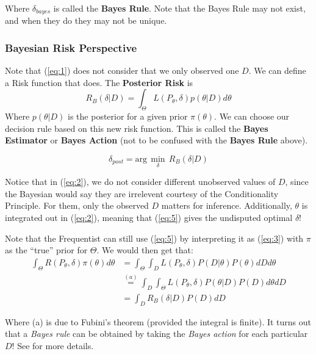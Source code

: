 \documentclass[]{article}
\theoremstyle{mattstyle}
\theoremstyle{definition}
\begin{document}
Where $\delta_{bayes}$ is called the \textbf{Bayes Rule}. Note that the Bayes Rule may not exist, and when they do they may not be unique.

\subsubsection{Bayesian Risk Perspective} 

Note that (\ref{eq:1}) does not consider that we only observed one \(D\). We can define a Risk function that does. The \textbf{Posterior Risk} is
\begin{equation}\label{eq:2}R_B(\delta|D) = \int_{\Theta}^{}L(P_{\theta},\delta)p(\theta|D)d\theta
\end{equation}
Where $p(\theta|D)$ is the posterior for a given prior $\pi(\theta)$. We can choose our decision rule based on this new risk function. This is called the \textbf{Bayes Estimator} or \textbf{Bayes Action} (not to be confused with the \textbf{Bayes Rule} above).

\begin{equation}\label{eq:5}
\delta_{post}= \text{arg}\,\min\limits_{\delta}\,R_B(\delta|D)
\end{equation}


Notice that in (\ref{eq:2}), we do not consider different unobserved values of \(D\), since the Bayesian would say they are irrelevent courtesy of the Conditionality Principle. For them, only the observed $D$ matters for inference. 
Additionally, \(\theta\) is integrated out in (\ref{eq:2}), meaning that (\ref{eq:5}) gives the undisputed optimal \(\delta\)! 

Note that the Frequentist can still use (\ref{eq:5}) by interpreting it as (\ref{eq:3}) with \(\pi\) as the ``true'' prior for \(\Theta\).
We would then get that:
\begin{align*}
 \int_{\Theta}^{}R(P_\theta,\delta)\pi(\theta)d\theta &= \int_{\Theta}^{}\int_{D}L(P_\theta,\delta)P(D|\theta)P(\theta)dDd\theta \\&\overset{(a)}{=} \int_{D}^{}\int_{\Theta}L(P_\theta,\delta)P(\theta|D)P(D)d\theta dD\\
&=\int_{D}^{}R_B(\delta|D)P(D)dD
\end{align*}

Where (a) is due to Fubini's theorem (provided the integral is finite).
It turns out that a \emph{Bayes rule} can be obtained by taking the \emph{Bayes action} for each particular $D$! See \cite{PHoffNotes2} for more details.
\end{document}

